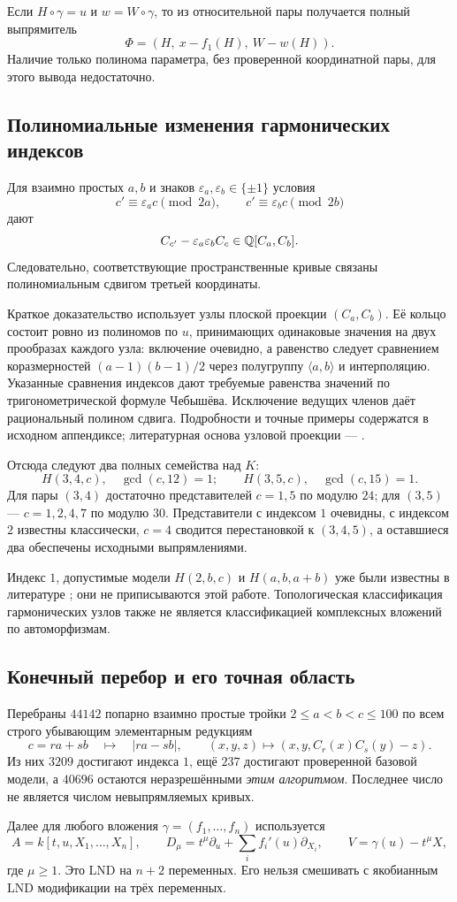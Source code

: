 Если $H\circ\gamma=u$ и $w=W\circ\gamma$, то из относительной пары
получается полный выпрямитель
\[
\Phi=(H,\ x-f_1(H),\ W-w(H)).
\]
Наличие только полинома параметра, без проверенной координатной пары,
для этого вывода недостаточно.

\subsection{Полиномиальные изменения гармонических индексов}
Для взаимно простых $a,b$ и знаков $\varepsilon_a,\varepsilon_b\in\{\pm1\}$
условия
\[
c'\equiv\varepsilon_a c\pmod{2a},\qquad
c'\equiv\varepsilon_b c\pmod{2b}
\]
дают
\[
C_{c'}-\varepsilon_a\varepsilon_b C_c\in{\mathbb{Q}}[C_a,C_b].
\]
Следовательно, соответствующие пространственные кривые связаны
полиномиальным сдвигом третьей координаты.

Краткое доказательство использует узлы плоской проекции
$(C_a,C_b)$. Её кольцо состоит ровно из полиномов по $u$, принимающих
одинаковые значения на двух прообразах каждого узла: включение очевидно,
а равенство следует сравнением коразмерностей
$(a-1)(b-1)/2$ через полугруппу $\langle a,b\rangle$ и интерполяцию.
Указанные сравнения индексов дают требуемые равенства значений по
тригонометрической формуле Чебышёва. Исключение ведущих членов даёт
рациональный полином сдвига. Подробности и точные примеры содержатся
в исходном аппендиксе; литературная основа узловой проекции --- \cite{FF}.

Отсюда следуют два полных семейства над $K$:
\[
H(3,4,c),\quad\gcd(c,12)=1;
\qquad H(3,5,c),\quad\gcd(c,15)=1.
\]
Для пары $(3,4)$ достаточно представителей $c=1,5$ по модулю $24$;
для $(3,5)$ --- $c=1,2,4,7$ по модулю $30$. Представители с индексом
$1$ очевидны, с индексом $2$ известны классически, $c=4$ сводится
перестановкой к $(3,4,5)$, а оставшиеся два обеспечены исходными
выпрямлениями.

Индекс $1$, допустимые модели $H(2,b,c)$ и $H(a,b,a+b)$ уже были
известны в литературе \cite{FF}; они не приписываются этой работе.
Топологическая классификация гармонических узлов \cite{KP} также не
является классификацией комплексных вложений по автоморфизмам.

\subsection{Конечный перебор и его точная область}
Перебраны $44142$ попарно взаимно простые тройки
$2\le a<b<c\le100$ по всем строго убывающим элементарным редукциям
\[
c=ra+sb\quad\longmapsto\quad |ra-sb|,
\qquad (x,y,z)\longmapsto(x,y,C_r(x)C_s(y)-z).
\]
Из них $3209$ достигают индекса $1$, ещё $237$ достигают проверенной
базовой модели, а $40696$ остаются неразрешёнными \emph{этим алгоритмом}.
Последнее число не является числом невыпрямляемых кривых.

Далее для любого вложения $\gamma=(f_1,\ldots,f_n)$ используется
\[
A=k[t,u,X_1,\ldots,X_n],\qquad
D_\mu=t^\mu\partial_u+\sum_i f_i'(u)\partial_{X_i},\qquad
V=\gamma(u)-t^\mu X,
\]
где $\mu\ge1$. Это LND на $n+2$ переменных. Его нельзя смешивать
с якобианным LND модификации на трёх переменных.

